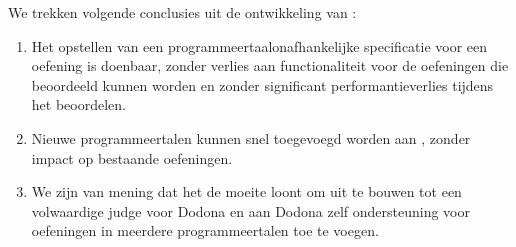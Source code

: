 We trekken volgende conclusies uit de ontwikkeling van \tested{}:

\begin{enumerate}
    \item Het opstellen van een programmeertaalonafhankelijke specificatie voor een oefening is doenbaar, zonder verlies aan functionaliteit voor de oefeningen die beoordeeld kunnen worden en zonder significant performantieverlies tijdens het beoordelen.
    \item Nieuwe programmeertalen kunnen snel toegevoegd worden aan \tested{}, zonder impact op bestaande oefeningen.
    \item We zijn van mening dat het de moeite loont om \tested{} uit te bouwen tot een volwaardige judge voor Dodona en aan Dodona zelf ondersteuning voor oefeningen in meerdere programmeertalen toe te voegen.
\end{enumerate}
